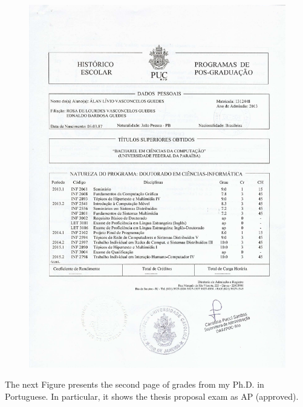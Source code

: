 \documentclass[10pt,a4paper,sans,colorlinks]{moderncv}
\begin{document}
\begin{figure}
    \centering
    \includegraphics[align=t,width=\textwidth,height=0.75\textheight, keepaspectratio=true]{certificates/phd-grades.pdf}
\end{figure}

\newpage
The next Figure presents the second page of grades from my Ph.D. in Portuguese. In particular, it shows the thesis proposal exam as AP (approved).
\end{document}
